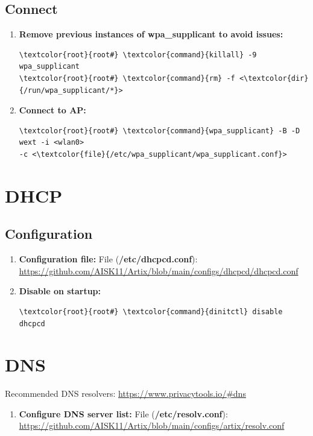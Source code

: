 \documentclass[10pt, a4paper, onecolumn, oneside, titlepage, openany]{book}
\begin{document}
\subsection{Connect}
\begin{enumerate}
    \item \textbf{Remove previous instances of wpa\_supplicant to avoid issues:}
\begin{Verbatim}[commandchars=\\\{\}]
\textcolor{root}{root#} \textcolor{command}{killall} -9 wpa_supplicant
\textcolor{root}{root#} \textcolor{command}{rm} -f <\textcolor{dir}{/run/wpa_supplicant/*}>
\end{Verbatim}
    \item \textbf{Connect to AP:}
\begin{Verbatim}[commandchars=\\\{\}]
\textcolor{root}{root#} \textcolor{command}{wpa_supplicant} -B -D wext -i <wlan0> 
-c <\textcolor{file}{/etc/wpa_supplicant/wpa_supplicant.conf}>
\end{Verbatim}
\end{enumerate}

\section{DHCP}
\subsection{Configuration}
\begin{enumerate}
    \item \textbf{Configuration file:}
\newline File (\textbf{\textcolor{file}{/etc/dhcpcd.conf}}):
\newline \url{https://github.com/AISK11/Artix/blob/main/configs/dhcpcd/dhcpcd.conf}
    \item \textbf{Disable on startup:}
\begin{Verbatim}[commandchars=\\\{\}]
\textcolor{root}{root#} \textcolor{command}{dinitctl} disable dhcpcd
\end{Verbatim}
\end{enumerate}

\section{DNS}
Recommended DNS resolvers: \url{https://www.privacytools.io/#dns}
\begin{enumerate}
    \item \textbf{Configure DNS server list:}
\newline File (\textbf{\textcolor{file}{/etc/resolv.conf}}):
\newline \url{https://github.com/AISK11/Artix/blob/main/configs/artix/resolv.conf}
\end{enumerate}
\end{document}

